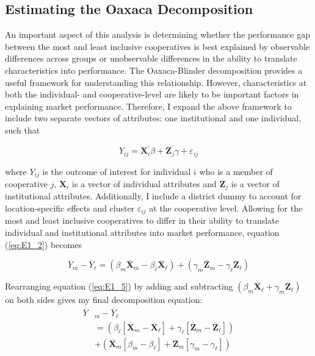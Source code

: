 \documentclass[11pt]{article}
\begin{document}
\subsection{Estimating the Oaxaca Decomposition} \label{sec:E1_est}

An important aspect of this analysis is determining whether the performance gap between the most and least inclusive cooperatives is best explained by observable differences across groups or unobservable differences in the ability to translate characteristics into performance. The Oaxaca-Blinder decomposition provides a useful framework for understanding this relationship. However, characteristics at both the individual- and cooperative-level are likely to be important factors in explaining market performance. Therefore, I expand the above framework to include two separate vectors of attributes: one institutional and one individual, such that

\begin{equation} \label{eq:E1_4}
   Y_{ij} = \mathbf{X}_i^{\prime}\beta + \mathbf{Z}_j^{\prime}\gamma + \varepsilon_{ij}
\end{equation}  

where $Y_{ij}$ is the outcome of interest for individual $i$ who is a member of cooperative $j$, $\mathbf{X}_i$ is a vector of individual attributes and $\mathbf{Z}_j$ is a vector of institutional attributes. Additionally, I include a district dummy to account for location-specific effects and cluster $\varepsilon_{ij}$ at the cooperative level. %
Allowing for the most and least inclusive cooperatives to differ in their ability to translate individual and institutional attributes into market performance, equation (\ref{eq:E1_2}) becomes

\begin{equation} \label{eq:E1_5}
        \overline{Y}_{m} - \overline{Y}_{\ell} =  (\beta_{m}\overline{\mathbf{X}}_{m} - \beta_{\ell}\overline{\mathbf{X}}_{\ell}) + (\gamma_{m}\overline{\mathbf{Z}}_{m} - \gamma_{\ell}\overline{\mathbf{Z}}_{\ell})
\end{equation}  

Rearranging equation (\ref{eq:E1_5}) by adding and subtracting $(\beta_{m}\overline{\mathbf{X}}_{\ell} + \gamma_{m}\overline{\mathbf{Z}}_{\ell})$ on both sides gives my final decomposition equation:
\begin{subequations}
    \begin{align}
        \overline{Y}&_{m} - \overline{Y}_{\ell} \label{eq:E1_6a} \\
        &= (\beta_{\ell}[\overline{\mathbf{X}}_{m} - \overline{\mathbf{X}}_{\ell}] + \gamma_{\ell}[\overline{\mathbf{Z}}_{m} - \overline{\mathbf{Z}}_{\ell}]) \label{eq:E1_6b} \\
        &+ (\overline{\mathbf{X}}_{m}[\beta_{m} - \beta_{\ell}] + \overline{\mathbf{Z}}_{m}[\gamma_{m} - \gamma_{\ell}]) \label{eq:E1_6c}
    \end{align}
\end{subequations}  
\end{document}
